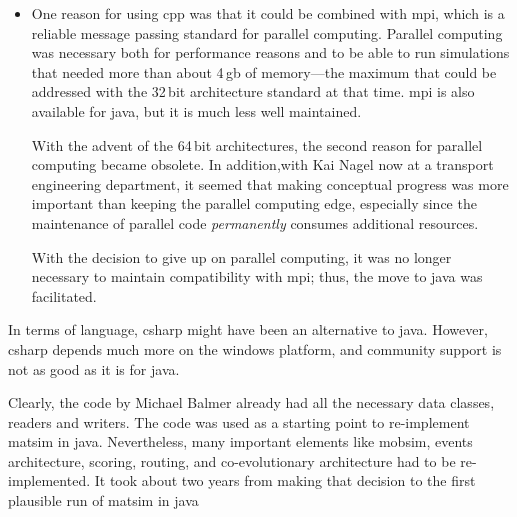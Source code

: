 \begin{itemize}


In addition, it seems that the gap between \gls{cpp} and \gls{java} has narrowed further since then.  Important differences remain in numerical applications, also partly because \gls{cpp}, other than the \gls{java}, allows operator overloading.\footnote{See \url{http://en.wikipedia.org/wiki/Operator_overloading}.}  However, \gls{matsim}'s agent-based approach means that complex objects are handled much more frequently than true numerical computations.

\item One reason for using \gls{cpp} was that it could be combined with \gls{mpi}, which is a reliable message passing standard for parallel computing.  Parallel computing was necessary both for performance reasons and to be able to run simulations that needed more than about 4\,\gls{gb} of memory---the maximum that could be addressed with the 32\,bit architecture standard at that time.  \gls{mpi} is also available for \gls{java}, but it is much less well maintained.

With the advent of the 64\,bit architectures, the second reason for parallel computing became obsolete. In addition,with Kai Nagel now at a transport engineering department, it seemed that making conceptual progress was more important than keeping the parallel computing edge, especially since the maintenance of parallel code \emph{permanently} consumes additional resources.

With the decision to give up on parallel computing, it was no longer necessary to maintain compatibility with \gls{mpi}; thus, the move to \gls{java} was facilitated.

\end{itemize}
%
In terms of language, \gls{csharp} might have been an alternative to \gls{java}.  However, \gls{csharp} depends much more on the \gls{windows} platform, and community support is not as good as it is for \gls{java}.

Clearly, the code by Michael Balmer already had all the necessary data classes, readers and writers. The code was used as a starting point to re-implement \gls{matsim} in \gls{java}.  Nevertheless, many important elements like \gls{mobsim}, events architecture, scoring, routing, and co-evolutionary architecture had to be re-implemented.  It took about two years from making that decision to the first plausible run of \gls{matsim} in \gls{java}

